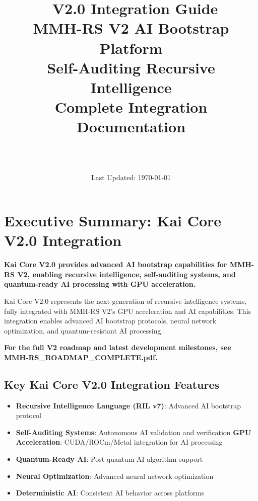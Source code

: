 \documentclass[12pt,a4paper]{article}
\title{\Huge\textbf{\project\ V2.0 Integration Guide}\\[0.5cm]
\Large\textbf{MMH-RS V2 AI Bootstrap Platform}\\[0.3cm]
\large Self-Auditing Recursive Intelligence\\[0.5cm]
\large Complete Integration Documentation}
\author{\Large\authorname\\[0.2cm]\email\\[0.2cm]\github}
\date{\large Last Updated: \today}
\begin{document}
\maketitle
\thispagestyle{empty}

\tableofcontents
\newpage

\section{Executive Summary: Kai Core V2.0 Integration}

\begin{tcolorbox}[colback=v2blue!10,colframe=v2blue!50,title=\textbf{Kai Core V2.0 Integration Summary}]
\textbf{Kai Core V2.0 provides advanced AI bootstrap capabilities for MMH-RS V2, enabling recursive intelligence, self-auditing systems, and quantum-ready AI processing with GPU acceleration.}

Kai Core V2.0 represents the next generation of recursive intelligence systems, fully integrated with MMH-RS V2's GPU acceleration and AI capabilities. This integration enables advanced AI bootstrap protocols, neural network optimization, and quantum-resistant AI processing.
\end{tcolorbox}

\textbf{For the full V2 roadmap and latest development milestones, see MMH-RS\_ROADMAP\_COMPLETE.pdf.}

\subsection{Key Kai Core V2.0 Integration Features}
\begin{itemize}
    \item \textbf{Recursive Intelligence Language (RIL v7)}: Advanced AI bootstrap protocol
    \item \textbf{Self-Auditing Systems}: Autonomous AI validation and verification
    \textbf{GPU Acceleration}: CUDA/ROCm/Metal integration for AI processing
    \item \textbf{Quantum-Ready AI}: Post-quantum AI algorithm support
    \item \textbf{Neural Optimization}: Advanced neural network optimization
    \item \textbf{Deterministic AI}: Consistent AI behavior across platforms
\end{itemize}
\end{document}
